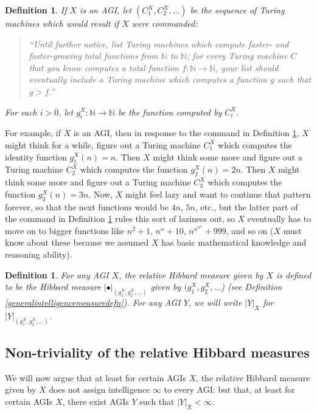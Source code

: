 \documentclass{article}
\newtheorem{definition}[theorem]{Definition}
\begin{document}
\begin{definition}
\label{functionlistdefinition}
    If $X$ is an AGI, let $(C^X_1, C^X_2, \ldots)$ be the sequence of
    Turing machines which would result if $X$ were commanded:
    \begin{quote}
        ``Until further notice, list Turing machines which compute faster- and
        faster-growing total functions from $\mathbb N$ to $\mathbb N$; for every
        Turing machine $C$ that you know computes a total
        function $f:\mathbb N\to\mathbb N$,
        your list should eventually
        include a Turing machine which computes a function $g$ such that $g>f$.''
    \end{quote}
    For each $i>0$, let $g^X_i:\mathbb N\to\mathbb N$ be the function computed by
    $C^X_i$.
\end{definition}

For example, if $X$ is an AGI, then in response to the command in Definition
\ref{functionlistdefinition}, $X$ might think for a while, figure out a Turing
machine $C^X_1$ which computes the identity function $g^X_1(n)=n$. Then $X$
might think some more and figure out a Turing machine $C^X_2$ which computes
the function $g^X_2(n)=2n$. Then $X$ might think some more and figure
out a Turing machine $C^X_3$ which computes the function $g^X_3(n)=3n$.
Now, $X$ might feel lazy and want to continue that pattern forever, so that
the next functions would be $4n$, $5n$, etc., but the latter part of the command in
Definition \ref{functionlistdefinition} rules this sort of laziness out, so $X$
eventually has to move on to bigger functions like $n^2+1$, $n^n+10$,
$n^{n^{n^{n}}}+999$,
and so on ($X$ must know about these because we assumed $X$ has basic mathematical
knowledge and reasoning ability).

\begin{definition}
    For any AGI $X$, the \emph{relative Hibbard measure given by $X$}
    is defined to be the Hibbard measure
    $|\bullet|_{(g^X_1,g^X_2,\ldots)}$
    given by
    $(g^X_1,g^X_2,\ldots$) (see Definition \ref{generalintelligencemeasuredefn}).
    For any AGI $Y$, we will write $|Y|_X$ for $|Y|_{(g^X_1,g^X_2,\ldots)}$.
\end{definition}

\subsection{Non-triviality of the relative Hibbard measures}

We will now argue that at least for certain AGIs $X$,
the relative Hibbard measure given by $X$ does not assign intelligence $\infty$
to every AGI: but that, at least for certain AGIs $X$, there exist AGIs $Y$
such that $|Y|_X<\infty$.
\end{document}
